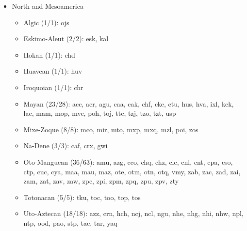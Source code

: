 \begin{itemize}[label={},leftmargin=0cm,labelindent=5pt,itemindent=0pt]
  \item North and Mesoamerica
    \begin{itemize}[label={},leftmargin=!,labelindent=5pt,itemindent=-15pt]
  	\item Algic (1/1): ojs
  	\item Eskimo-Aleut (2/2): esk, kal
  	\item Hokan (1/1): chd
  	\item Huavean (1/1): huv
  	\item Iroquoian (1/1): chr
  	\item Mayan (23/28): acc, acr, agu, caa, cak, chf, cke, ctu, hus, hva, ixl, kek, lac, mam, mop, mvc, poh, toj, ttc, tzj, tzo, tzt, usp
  	\item Mixe-Zoque (8/8): mco, mir, mto, mxp, mxq, mzl, poi, zos
  	\item Na-Dene (3/3): caf, crx, gwi
  	\item Oto-Manguean (36/63): amu, azg, cco, chq, chz, cle, cnl, cnt, cpa, cso, ctp, cuc, cya, maa, mau, maz, ote, otm, otn, otq, vmy, zab, zac, zad, zai, zam, zat, zav, zaw, zpc, zpi, zpm, zpq, zpu, zpv, zty
  	\item Totonacan (5/5): tku, toc, too, top, tos
  	\item Uto-Aztecan (18/18): azz, crn, hch, ncj, ncl, ngu, nhe, nhg, nhi, nhw, npl, ntp, ood, pao, stp, tac, tar, yaq
    \end{itemize}


\end{itemize}
